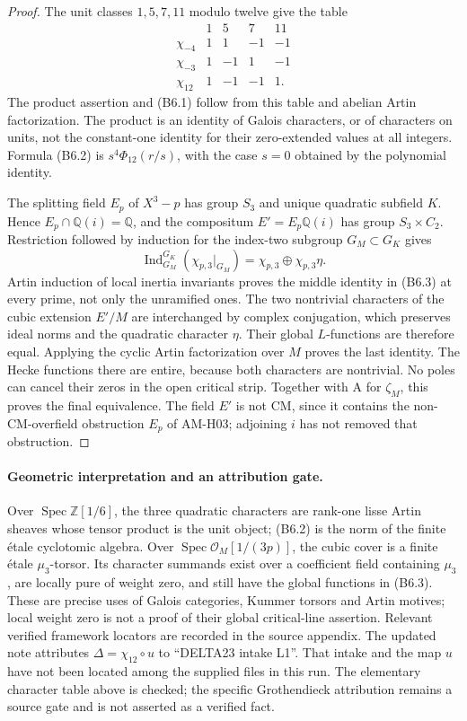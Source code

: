 \begin{proof}
The unit classes $1,5,7,11$ modulo twelve give the table
\[
\begin{array}{c|rrrr}
 &1&5&7&11\\\hline
 \chi_{-4}&1&1&-1&-1\\
 \chi_{-3}&1&-1&1&-1\\
 \chi_{12}&1&-1&-1&1.
\end{array}
\]
The product assertion and (B6.1) follow from this table
and abelian Artin factorization. The product is an
identity of Galois characters, or of characters on
units, not the constant-one identity for their
zero-extended values at all integers. Formula (B6.2)
is $s^4\Phi_{12}(r/s)$, with the case $s=0$ obtained
by the polynomial identity.

The splitting field $E_p$ of $X^3-p$ has group $S_3$
and unique quadratic subfield $K$. Hence
$E_p\cap\mathbb Q(i)=\mathbb Q$, and the compositum
$E'=E_p\mathbb Q(i)$ has group $S_3\times C_2$.
Restriction followed by induction for the index-two
subgroup $G_M\subset G_K$ gives
\[
 \operatorname{Ind}_{G_M}^{G_K}
      (\chi_{p,3}|_{G_M})
              =\chi_{p,3}\oplus\chi_{p,3}\eta.
\]
Artin induction of local inertia invariants proves
the middle identity in (B6.3) at every prime, not only
the unramified ones. The two nontrivial characters
of the cubic extension $E'/M$ are interchanged by
complex conjugation, which preserves ideal norms
and the quadratic character $\eta$. Their global
$L$-functions are therefore equal. Applying the
cyclic Artin factorization over $M$ proves the last
identity. The Hecke functions there are entire,
because both characters are nontrivial. No poles
can cancel their zeros in the open critical strip.
Together with A for $\zeta_M$, this proves the final
equivalence. The field $E'$ is not CM, since it
contains the non-CM-overfield obstruction $E_p$
of AM-H03; adjoining $i$ has not removed that
obstruction.
\end{proof}

\paragraph{Geometric interpretation and an attribution gate.}
Over $\operatorname{Spec}\mathbb Z[1/6]$, the three
quadratic characters are rank-one lisse Artin sheaves
whose tensor product is the unit object; (B6.2) is the
norm of the finite \'etale cyclotomic algebra. Over
$\operatorname{Spec}\mathcal O_M[1/(3p)]$, the cubic
cover is a finite \'etale $\mu_3$-torsor. Its character
summands exist over a coefficient field containing
$\mu_3$, are locally pure of weight zero, and still
have the global functions in (B6.3). These are precise
uses of Galois categories, Kummer torsors and Artin
motives; local weight zero is not a proof of their
global critical-line assertion. Relevant verified
framework locators are recorded in the source appendix.
The updated note attributes $\Delta=\chi_{12}\circ u$
to ``DELTA23 intake L1''. That intake and the map $u$
have not been located among the supplied files in this
run. The elementary character table above is checked;
the specific Grothendieck attribution remains a
source gate and is not asserted as a verified fact.
